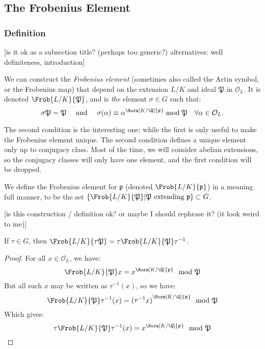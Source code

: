 \subsection{The Frobenius Element}
\subsubsection{Definition}
[is it ok as a subsection title? (perhaps too generic?) alternatives: well definiteness, introduction]

We can construct the \textit{Frobenius element} (sometimes also called the Artin symbol, or the Frobenius map) that depend on the extension $L/K$ and ideal $\mathfrak{P}$ in $\mathcal{O}_L$.
It is denoted $\Frob{L/K}{\mathfrak{P}}$, and is \textit{the} element $\sigma \in G$ such that:
$$
\sigma \mathfrak{P} = \mathfrak{P}
\quad \text{ and } \quad
\sigma(\alpha) \equiv \alpha^{\Norm[K/\Q]{\mathfrak{p}}} \bmod{\mathfrak{P}} \quad \forall \alpha \in \mathcal{O}_L.
$$

The second condition is the interesting one; while the first is only useful to make the Frobenius element unique.
The second condition defines a unique element only up to conjugacy class.
Most of the time, we will consider abelian extensions, so the conjugacy classes will only have one element, and the first condition will be dropped.

We define the Frobenius element for $\mathfrak{p}$ (denoted $\Frob{L/K}{\mathfrak{p}}$) in a meaning full manner, to be the set 
$
\{ \Frob{L/K}{\mathfrak{P}} | \mathfrak{P} 
\text{ extending } \mathfrak{p} \} \subset G
$.

[is this construction / definition ok? or maybe I should rephrase it? (it look weird to me)]

\begin{property}
	If $\tau \in G$, then 
	$\Frob{L/K}{\mathfrak{\tau P}} = \tau \Frob{L/K}{\mathfrak{P}} \tau^{-1}$.
\end{property}
\begin{proof}
	For all $x \in \mathcal{O}_L$, we have:
	$$
	\Frob{L/K}{\mathfrak{P}}x 
	= x^{\Norm[K/\Q]{\mathfrak{p}}} \mod \mathfrak{P}
	$$
	But all such $x$ may be written as $\tau^{-1}(x)$, so we have:
	$$
	\Frob{L/K}{\mathfrak{P}} \tau^{-1}(x) 
	= {(\tau^{-1} x)}^{\Norm[K/\Q]{\mathfrak{p}}} \mod \mathfrak{P}
	$$
	Which gives:
	$$
	\tau \Frob{L/K}{\mathfrak{P}}\tau^{-1}(x) 
	= x^{\Norm[K/\Q]{\mathfrak{p}}} \mod \mathfrak{P}
	$$
\end{proof}


